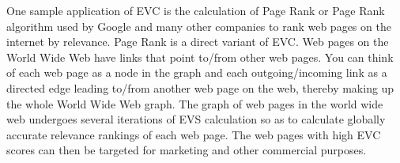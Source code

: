 \documentclass[12pt, a4paper]{article}
\begin{document}
\begin{flushleft}
    One sample application of EVC is the calculation of Page Rank or Page Rank algorithm used by Google and many other companies to rank web pages on the internet by relevance. Page Rank is a direct variant of EVC. Web pages on the World Wide Web have links that point to/from other web pages. You can think of each web page as a node in the graph and each outgoing/incoming link as a directed edge leading to/from another web page on the web, thereby making up the whole World Wide Web graph. The graph of web pages in the world wide web undergoes several iterations of EVS calculation so as to calculate globally accurate relevance rankings of each web page. The web pages with high EVC scores can then be targeted for marketing and other commercial purposes. \cite{Bhasin22}

  \end{flushleft}
\end{document}
